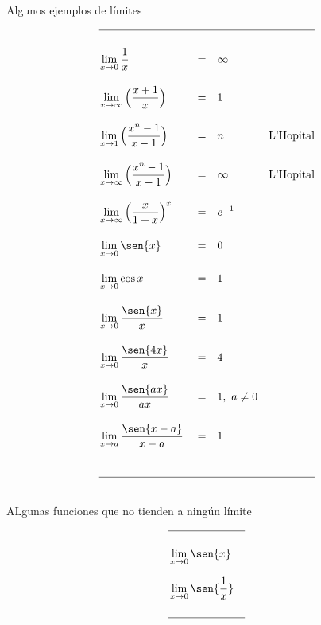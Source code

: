 \documentclass[12pt,a4paper]{extarticle}
\begin{document}
\begin{table}[!htbp]
\caption{Algunos ejemplos de l\'imites}
{\renewcommand{\arraystretch}{1.5}
\begin{align*}
\hline \\
& \lim_{x \to 0}\frac{1}{x} && =     && \infty  &\\[1em]
& \lim_{x \to \infty}\Big(\frac{x+1}{x}\Big)&&=  && 1 &\\[1em]
&\lim_{x \to 1}\Big(\frac{x^n-1}{x-1}\Big)&& =  && n & \text{L'Hopital}\\[1em]
&\lim_{x \to \infty}\Big(\frac{x^n-1}{x-1}\Big)&& =  && \infty &\text{L'Hopital}\\[1em]
&\lim_{x \to \infty}\Big(\frac{x}{1+x}\Big)^x&& =   && e^{-1} &\\[1em]
&\lim_{x \to 0} \sen{x} &&= && 0 &\\[1em]
&\lim_{x \to 0} \cos{x} &&= && 1 &\\[1em]
& \lim_{x \to 0}\frac{\sen{x}}{x} && = && 1 &\\[1em]
& \lim_{x \to 0}\frac{\sen{4x}}{x} && = && 4 &\\[1em]
& \lim_{x \to 0}\frac{\sen{ax}}{ax} && = && 1 , \ a \neq 0 \\[1em]
& \lim_{x \to a}\frac{\sen{x-a}}{x-a} && = && 1  &\\[1em]
\vspace{1cm}\\
\hline \\
\end{align*}
}
\label{tab:limReg}
\end{table}

\begin{table}[!htbp]
\caption{ALgunas funciones que no tienden a ning\'un l\'imite}
{\renewcommand{\arraystretch}{1.5}
\begin{align*}
\hline \\
&\lim_{x \to 0}\sen{x} &\\[0.7em]
&\lim_{x \to 0}\sen{\frac{1}{x}} &\\
\vspace{1cm}\\
\hline \\
\end{align*}
}
\label{tab:nolim}
\end{table}

\vspace{.5cm}
\end{document}
